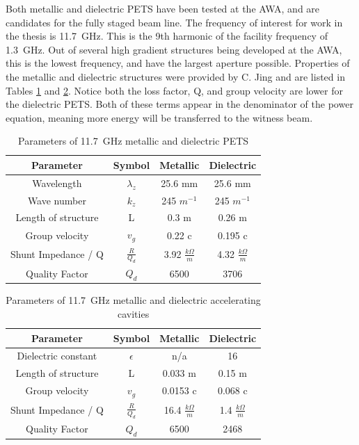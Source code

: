 Both metallic and dielectric PETS have been tested at the AWA, 
and are candidates for the fully staged beam line. 
The frequency of interest for work in the thesis is \SI{11.7}{GHz}. 
This is the 9th harmonic of the facility frequency of \SI{1.3}{GHz}.
Out of several high gradient structures being developed at the AWA, 
this is the lowest frequency, and have the largest aperture possible. 
Properties of the metallic and dielectric structures were provided by C. Jing and are listed in 
Tables \ref{table:PETS} and \ref{table:acc}. 
Notice both the loss factor, Q, and group velocity are lower for the dielectric PETS. 
Both of these terms appear in the denominator of the power equation, meaning more
energy will be transferred to the witness beam.
\begin{table}
	\begin{center}
	\caption{Parameters of \SI{11.7}{GHz} metallic and dielectric PETS}
	\label{table:PETS}
	
			\begin{tabular}{cccc}  
			\toprule
			\toprule
			\textbf{Parameter} & \textbf{Symbol} & \textbf{Metallic }& \textbf{Dielectric} \\
			\midrule
			Wavelength 	& $\lambda_{z}$ & 25.6 mm 	&  25.6 mm	\\  
			Wave number & $k_{z}$ 		& 245 $m^{-1}$ 	& 245 $m^{-1}$\\  
			Length of structure & L & 0.3 m & 0.26 m\\  
			Group velocity & $v_{g}$ & 0.22 c & 0.195 c\\  
			Shunt Impedance / Q & $\frac{R}{Q_{d}}$ & 3.92 $\frac{k\Omega}{m}$  & 4.32 $\frac{k\Omega}{m}$\\  
			Quality Factor & $Q_{d}$ & 6500 &3706\\  
			\bottomrule		
		\end{tabular}
\end{center}
\end{table}
\begin{table}
	\begin{center}
		\caption{Parameters of \SI{11.7}{GHz} metallic and dielectric accelerating cavities}
		\label{table:acc}
		
		\begin{tabular}{cccc}  
			\toprule
			\toprule
			\textbf{Parameter} & \textbf{Symbol} & \textbf{Metallic }& \textbf{Dielectric} \\
			\midrule
			Dielectric constant & $\epsilon$ & n/a & 16 \\
			Length of structure & L & 0.033 m & 0.15 m\\  
			Group velocity & $v_{g}$ & 0.0153 c & 0.068 c\\  
			Shunt Impedance / Q & $\frac{R}{Q_{d}}$ & 16.4 $\frac{k\Omega}{m}$  & 1.4 $\frac{k\Omega}{m}$\\  
			Quality Factor & $Q_{d}$ & 6500  &2468\\  
			\bottomrule		
		\end{tabular}
	\end{center}
\end{table}

